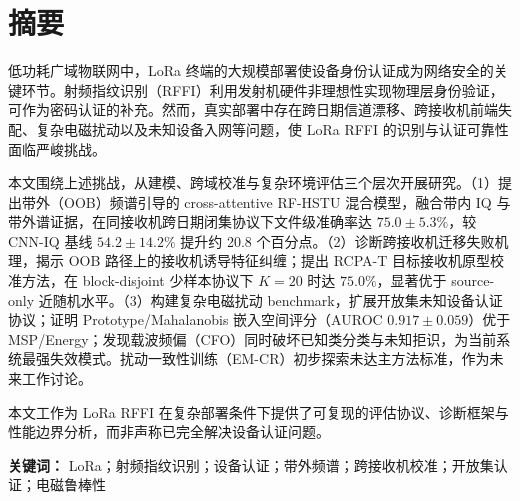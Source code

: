 \chapter*{摘要}

低功耗广域物联网中，LoRa 终端的大规模部署使设备身份认证成为网络安全的关键环节。射频指纹识别（RFFI）利用发射机硬件非理想性实现物理层身份验证，可作为密码认证的补充。然而，真实部署中存在跨日期信道漂移、跨接收机前端失配、复杂电磁扰动以及未知设备入网等问题，使 LoRa RFFI 的识别与认证可靠性面临严峻挑战。

本文围绕上述挑战，从建模、跨域校准与复杂环境评估三个层次开展研究。（1）提出带外（OOB）频谱引导的 cross-attentive RF-HSTU 混合模型，融合带内 IQ 与带外谱证据，在同接收机跨日期闭集协议下文件级准确率达 $75.0\pm5.3\%$，较 CNN-IQ 基线 $54.2\pm14.2\%$ 提升约 20.8 个百分点。（2）诊断跨接收机迁移失败机理，揭示 OOB 路径上的接收机诱导特征纠缠；提出 RCPA-T 目标接收机原型校准方法，在 block-disjoint 少样本协议下 $K{=}20$ 时达 $75.0\%$，显著优于 source-only 近随机水平。（3）构建复杂电磁扰动 benchmark，扩展开放集未知设备认证协议；证明 Prototype/Mahalanobis 嵌入空间评分（AUROC $0.917\pm0.059$）优于 MSP/Energy；发现载波频偏（CFO）同时破坏已知类分类与未知拒识，为当前系统最强失效模式。扰动一致性训练（EM-CR）初步探索未达主方法标准，作为未来工作讨论。

本文工作为 LoRa RFFI 在复杂部署条件下提供了可复现的评估协议、诊断框架与性能边界分析，而非声称已完全解决设备认证问题。

\vspace{1em}
\noindent\textbf{关键词：} LoRa；射频指纹识别；设备认证；带外频谱；跨接收机校准；开放集认证；电磁鲁棒性
